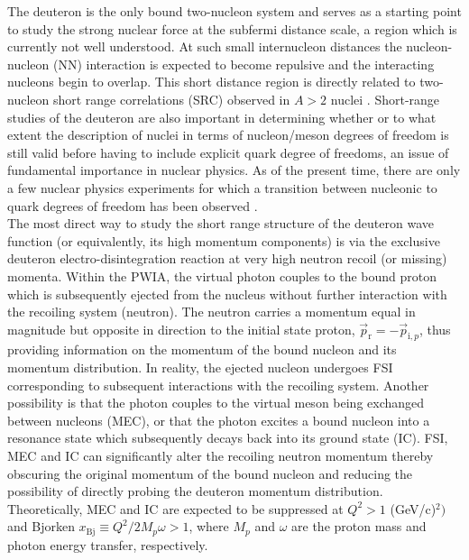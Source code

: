 The deuteron is the only bound two-nucleon  system and serves as a starting point to study the strong nuclear force at the subfermi distance scale, a region which is currently
not well understood. At such small internucleon distances the nucleon-nucleon (NN) interaction is expected to become repulsive and the interacting
nucleons begin to overlap. 
This short distance region is directly related to two-nucleon short range correlations (SRC) observed in $A>2$ nuclei \cite{PhysRevC.68.014313,PhysRevLett.96.082501,PhysRevLett.99.072501,Fomin_2017}.
Short-range studies of the deuteron are also important in determining whether or to what extent the description of nuclei in terms of nucleon/meson degrees of freedom is still valid before
having to include explicit quark degree of freedoms, an issue of fundamental importance in nuclear physics\cite{sargsian_2015}. As of the present time, there are only a few nuclear physics experiments for
which a transition between nucleonic to quark degrees of freedom has been observed \cite{PhysRevLett.81.4576,PhysRevLett.87.102302,PhysRevC.66.042201}. \\
\indent The most direct way to study the short range structure of the deuteron wave function (or equivalently, its high momentum components) is via the exclusive deuteron
electro-disintegration reaction at very high neutron recoil (or missing) momenta. Within the PWIA, the virtual photon couples to
the bound proton which is subsequently ejected from the nucleus without further interaction with the recoiling system (neutron). The neutron carries a momentum equal in magnitude but opposite in direction
to the initial state proton, $\vec{p}_{\mathrm{r}} = -\vec{p}_{\mathrm{i},p}$, thus providing information on the momentum of the bound nucleon and its momentum distribution. 
In reality, the ejected nucleon undergoes FSI corresponding to subsequent interactions with the recoiling system. Another possibility is that the
photon couples to the virtual meson being exchanged between nucleons (MEC), or that the photon excites a bound nucleon into a resonance state which subsequently
decays back into its ground state (IC).  FSI, MEC and IC can significantly alter the recoiling neutron
momentum thereby obscuring the original momentum of the bound nucleon and reducing the possibility of directly probing the deuteron momentum distribution. \\
\indent Theoretically, MEC and IC are expected to be suppressed at $Q^{2}>1$ (GeV/c)$^{2})$ and Bjorken $x_{\mathrm{Bj}}\equiv Q^{2}/2M_{p}\omega>1$, where $M_{p}$ and $\omega$ are the proton mass and photon energy transfer, respectively.
